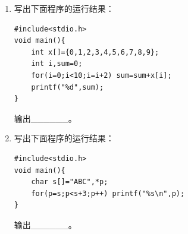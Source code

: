 \documentclass[a4paper,12pt]{article}
\begin{document}
\begin{enumerate}
	\item 写出下面程序的运行结果：
	      \begin{verbatim}
#include<stdio.h>
void main(){
    int x[]={0,1,2,3,4,5,6,7,8,9};
    int i,sum=0;
    for(i=0;i<10;i=i+2) sum=sum+x[i];
    printf("%d",sum);
}
    \end{verbatim}
	      输出\_\_\_\_\_\_。
	      \vspace{0.3cm}

	\item 写出下面程序的运行结果：
	      \begin{verbatim}
#include<stdio.h>
void main(){
    char s[]="ABC",*p;
    for(p=s;p<s+3;p++) printf("%s\n",p);
}
    \end{verbatim}
	      输出\_\_\_\_\_\_。
	      \vspace{0.3cm}
\end{enumerate}
\end{document}
